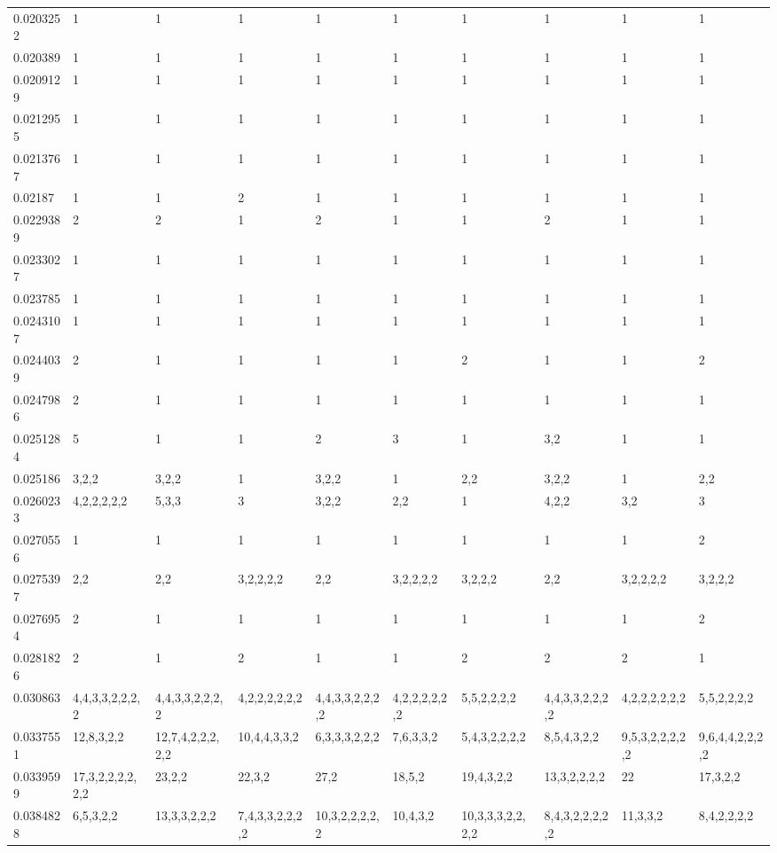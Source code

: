 \documentclass[varwidth=true, border={0, 15}]{standalone}
\begin{document}
\begin{table}[ht]
\begin{tabular}{llllllllll}
  0.0203252 & 1 & 1 & 1 & 1 & 1 & 1 & 1 & 1 & 1 \\ 
  0.020389 & 1 & 1 & 1 & 1 & 1 & 1 & 1 & 1 & 1 \\ 
  0.0209129 & 1 & 1 & 1 & 1 & 1 & 1 & 1 & 1 & 1 \\ 
  0.0212955 & 1 & 1 & 1 & 1 & 1 & 1 & 1 & 1 & 1 \\ 
  0.0213767 & 1 & 1 & 1 & 1 & 1 & 1 & 1 & 1 & 1 \\ 
  0.02187 & 1 & 1 & 2 & 1 & 1 & 1 & 1 & 1 & 1 \\ 
  0.0229389 & 2 & 2 & 1 & 2 & 1 & 1 & 2 & 1 & 1 \\ 
  0.0233027 & 1 & 1 & 1 & 1 & 1 & 1 & 1 & 1 & 1 \\ 
  0.023785 & 1 & 1 & 1 & 1 & 1 & 1 & 1 & 1 & 1 \\ 
  0.0243107 & 1 & 1 & 1 & 1 & 1 & 1 & 1 & 1 & 1 \\ 
  0.0244039 & 2 & 1 & 1 & 1 & 1 & 2 & 1 & 1 & 2 \\ 
  0.0247986 & 2 & 1 & 1 & 1 & 1 & 1 & 1 & 1 & 1 \\ 
  0.0251284 & 5 & 1 & 1 & 2 & 3 & 1 & 3,2 & 1 & 1 \\ 
  0.025186 & 3,2,2 & 3,2,2 & 1 & 3,2,2 & 1 & 2,2 & 3,2,2 & 1 & 2,2 \\ 
  0.0260233 & 4,2,2,2,2,2 & 5,3,3 & 3 & 3,2,2 & 2,2 & 1 & 4,2,2 & 3,2 & 3 \\ 
  0.0270556 & 1 & 1 & 1 & 1 & 1 & 1 & 1 & 1 & 2 \\ 
  0.0275397 & 2,2 & 2,2 & 3,2,2,2,2 & 2,2 & 3,2,2,2,2 & 3,2,2,2 & 2,2 & 3,2,2,2,2 & 3,2,2,2 \\ 
  0.0276954 & 2 & 1 & 1 & 1 & 1 & 1 & 1 & 1 & 2 \\ 
  0.0281826 & 2 & 1 & 2 & 1 & 1 & 2 & 2 & 2 & 1 \\ 
  0.030863 & 4,4,3,3,2,2,2,2 & 4,4,3,3,2,2,2,2 & 4,2,2,2,2,2,2 & 4,4,3,3,2,2,2,2 & 4,2,2,2,2,2,2 & 5,5,2,2,2,2 & 4,4,3,3,2,2,2,2 & 4,2,2,2,2,2,2 & 5,5,2,2,2,2 \\ 
  0.0337551 & 12,8,3,2,2 & 12,7,4,2,2,2,2,2 & 10,4,4,3,3,2 & 6,3,3,3,2,2,2 & 7,6,3,3,2 & 5,4,3,2,2,2,2 & 8,5,4,3,2,2 & 9,5,3,2,2,2,2,2 & 9,6,4,4,2,2,2,2 \\ 
  0.0339599 & 17,3,2,2,2,2,2,2 & 23,2,2 & 22,3,2 & 27,2 & 18,5,2 & 19,4,3,2,2 & 13,3,2,2,2,2 & 22 & 17,3,2,2 \\ 
  0.0384828 & 6,5,3,2,2 & 13,3,3,2,2,2 & 7,4,3,3,2,2,2,2 & 10,3,2,2,2,2,2 & 10,4,3,2 & 10,3,3,3,2,2,2,2 & 8,4,3,2,2,2,2,2 & 11,3,3,2 & 8,4,2,2,2,2 \\ 
   \hline
\end{tabular}
\end{table}
\end{document}
